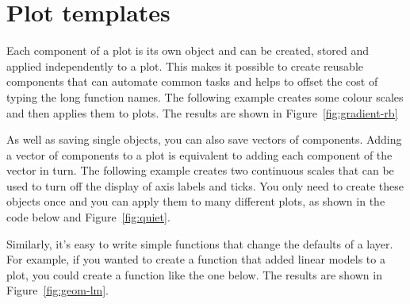 % 


\section{Plot templates}
\label{sec:templates}

Each component of a \ggplot plot is its own object and can be created, stored and applied independently to a plot. This makes it possible to create reusable components that can automate common tasks and helps to offset the cost of typing the long function names. The following example creates some colour scales and then applies them to plots. The results are shown in Figure~\ref{fig:gradient-rb}

% 


As well as saving single objects, you can also save vectors of \ggplot components.  Adding a vector of components to a plot is equivalent to adding each component of the vector in turn.  The following example creates two continuous scales that can be used to turn off the display of axis labels and ticks.  You only need to create these objects once and you can apply them to many different plots, as shown in the code below and Figure~\ref{fig:quiet}.

% 
% 


Similarly, it's easy to write simple functions that change the defaults of a layer. For example, if you wanted to create a function that added linear models to a plot, you could create a function like the one below.  The results are shown in Figure~\ref{fig:geom-lm}.  

